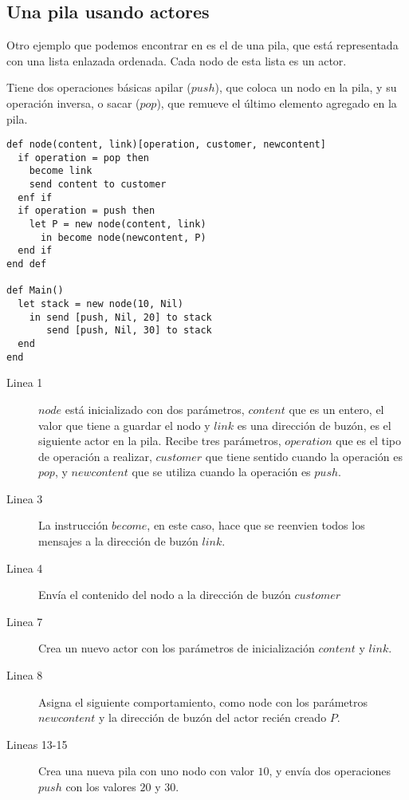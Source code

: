 \subsection{Una pila usando actores}

Otro ejemplo que podemos encontrar en \cite{Agha:1986:AMC:7929} es el de una pila, que está representada con una lista enlazada ordenada. Cada nodo de esta lista es un actor. 

Tiene dos operaciones básicas apilar ($push$), que coloca un nodo en la pila, y su operación inversa, o sacar ($pop$), que remueve el último elemento agregado en la pila.

\begin{lstlisting}[language=sal, style=simple]
def node(content, link)[operation, customer, newcontent]
  if operation = pop then
    become link 
    send content to customer
  enf if
  if operation = push then
    let P = new node(content, link)
      in become node(newcontent, P) 
  end if
end def

def Main() 
  let stack = new node(10, Nil)
    in send [push, Nil, 20] to stack 
       send [push, Nil, 30] to stack
  end
end
\end{lstlisting}

\begin{description}

\item [Linea 1] $node$ está inicializado con dos parámetros, $content$ que es un entero, el valor que tiene a guardar el nodo y  $link$ es una dirección de buzón, es el siguiente actor en la pila. Recibe tres parámetros, $operation$ que es el tipo de operación a realizar,  $customer$ que tiene sentido cuando la operación es $pop$, y $newcontent$ que se utiliza cuando la operación es $push$.
\item [Linea 3] La instrucción $become$, en este caso, hace que se reenvien todos los mensajes a la dirección de buzón $link$. 
\item [Linea 4] Envía el contenido del nodo a la dirección de buzón $customer$
\item [Linea 7] Crea un nuevo actor con los parámetros de inicialización $content$ y $link$.
\item [Linea 8] Asigna el siguiente comportamiento, como node con los parámetros $newcontent$ y la dirección de buzón del actor recién creado $P$. 
\item [Lineas 13-15] Crea una nueva pila con uno nodo con valor $10$, y envía dos operaciones $push$ con los valores $20$ y $30$.
\end{description}

